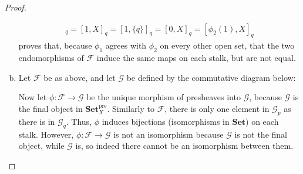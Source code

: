 \documentclass{article}
\newcommand{\fF}{\mathscr{F}}
\newcommand{\fG}{\mathscr{G}}
\DeclareMathOperator{\res}{res}
\newcommand{\Set}{\mathbf{Set}} %
\let\emptyset\varnothing
\begin{document}
\begin{proof}
\begin{enumerate}[(a)]
\begin{align*}
            [\phi_1(1),X]_q=[1,X]_q=[1,\{q\}]_q=[0,X]_q=[\phi_2(1),X]_q
        \end{align*}
        proves that, because $\phi_1$ agrees with $\phi_2$ on every other open set, that the two endomorphisms of $\fF$ induce the same maps on each stalk, but are not equal.
        \item Let $\fF$ be as above, and let $\fG$ be defined by the commutative diagram below:
        \begin{center}
        \end{center}
        Now let $\phi:\fF\to \fG$ be the unique morphism of presheaves into $\fG$, because $\fG$ is the final object in $\Set^{\text{pre}}_X$. Similarly to $\fF$, there is only one element in $\fG_p$ as there is in $\fG_q$. Thus, $\phi$ induces bijections (isomorphisms in $\Set$) on each stalk. However, $\phi:\fF\to \fG$ is not an isomorphism because $\fG$ is not the final object, while $\fG$ is, so indeed there cannot be an isomorphism between them.
    \end{enumerate}
\end{proof}
\end{document}
